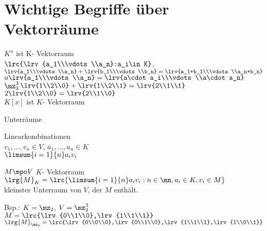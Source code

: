 \section{Wichtige Begriffe über Vektorräume}
		\item $K^n$ ist K- Vektorraum\\
		$\lrc{\lrv{a_1\\\vdots\\a_n}:a_i\in K}$, $\lrv{a_1\\\vdots\\a_n}+\lrv{b_1\\\vdots\\b_n}=
		\lrv{a_1+b_1\\\vdots\\a_n+b_n}$\\
		$a\lrv{a_1\\\vdots\\a_n}=\lrv{a\cdot a_i\\\vdots\\a\cdot a_n}$\\
		$\mz^3_3$\quad$\lrv{1\\2\\0}+\lrv{1\\2\\1}=\lrv{2\\1\\1}$\\
		$2\lrv{1\\2\\0}=\lrv{2\\1\\0}$\\
		$K[x]$ ist $K$- Vektorraum
		\item Unterräume
		\item Linearkombinationen\\
		$v_1,...,v_n\in V$, $a_1,...,a_n\in K$\\
		$\limsum{i=1}{n}a_iv_i$
		\item $M\mpo V$ $K$- Vektorraum\\
		$\lrg{M}_K=\lrc{\limsum{i=1}{n}a_iv_i:n\in\mn,a_i\in K,v_i\in M}$\\
		kleinster Unterraum von $V$, der $M$ enthält.

		Bsp.: $K=\mz_2$, $V=\mz^3_2$\\
		$M=\lrc{\lrv{0\\1\\0},\lrv{1\\1\\1}}$\\
		$\lrg{M}_{\mz_2}=\lrc{\lrv{0\\0\\0},\lrv{0\\1\\0},\lrv{1\\1\\1},\lrv{1\\0\\1}}$


